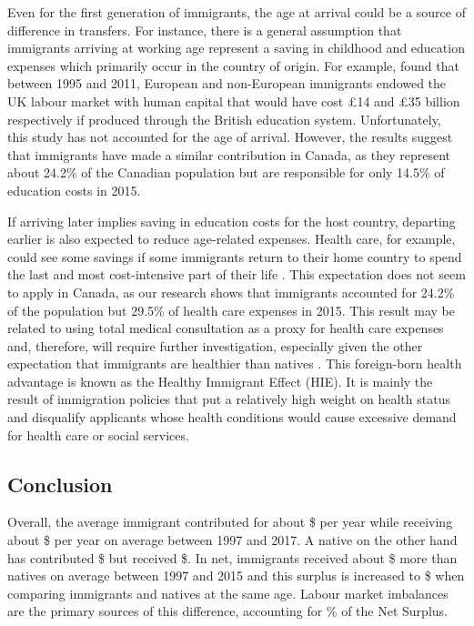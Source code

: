 \vspace{0.7em}\par
Even for the first generation of immigrants, the age at arrival could be a source of difference in transfers.
For instance, there is a general assumption that immigrants arriving at working age represent a saving in childhood and education expenses which primarily occur in the country of origin.
For example, \citet{Dustmann:2014dr} found that between 1995 and 2011, European and non-European immigrants endowed the UK labour market with human capital that would have cost \pounds14 and \pounds35 billion respectively if produced through the British education system.
Unfortunately, this study has not accounted for the age of arrival.
However, the results suggest that immigrants have made a similar contribution in Canada, as they represent about 24.2\% of the Canadian population but are responsible for only 14.5\% of education costs in 2015.

\vspace{0.7em}\par
If arriving later implies saving in education costs for the host country, departing earlier is also expected to reduce age-related expenses.
Health care, for example, could see some savings if some immigrants return to their home country to spend the last and most cost-intensive part of their life \citep{Bratsberg:2014cl}.
This expectation does not seem to apply in Canada, as our research shows that immigrants accounted for 24.2\% of the population but 29.5\% of health care expenses in 2015. This result may be related to using total medical consultation as a proxy for health care expenses and, therefore, will require further investigation, especially given the other expectation that immigrants are healthier than natives \citep{Ichou:2019ik,Vang:2016di}.
This foreign-born health advantage is known as the Healthy Immigrant Effect (HIE). It is mainly the result of immigration policies that put a relatively high weight on health status and disqualify applicants whose health conditions would cause excessive demand for health care or social services.


\subsection{Conclusion}

Overall, the average immigrant contributed for about \$ per year while receiving about \$ per year on average between 1997 and 2017.
A native on the other hand has contributed \$ but received \$.
In net, immigrants received about \$ more than natives on average between 1997 and 2015 and this surplus is increased to \$ when comparing immigrants and natives at the same age.
Labour market imbalances are the primary sources of this difference, accounting for \% of the Net Surplus.

